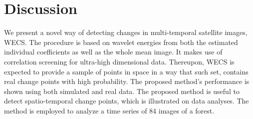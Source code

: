 \documentclass[journal]{IEEEtran}
\begin{document}
\section{Discussion}\label{section_discussion}

We present a novel way of detecting changes in multi-temporal satellite images, WECS. The procedure is based on wavelet energies from both the estimated individual coefficients as well as the whole mean image. It makes use of correlation screening for ultra-high dimensional data. Thereupon, WECS is expected to provide a sample of points in space in a way that such set, contains real change points with high probability. The proposed method's performance is shown using both simulated and real data. The proposed method is useful to detect spatio-temporal change points, which is illustrated on data analyses. The method is employed to analyze a time series of 84 images of a forest.





%

%
\end{document}
